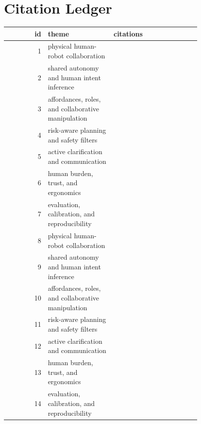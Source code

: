 \documentclass{article}
\begin{document}
\section{Citation Ledger}
\begingroup
\scriptsize
\setlength{\tabcolsep}{4pt}
\begin{longtable}{r p{0.34\linewidth} p{0.45\linewidth}}
\toprule
id & theme & citations\\
\midrule
1 & physical human-robot collaboration & \citep{ogenyi2019physical1,zhang2022cooperative2,dehio2022enabling3} \\
2 & shared autonomy and human intent inference & \citep{lai2022user4,li2022humanaware5,liu2025dtrt6} \\
3 & affordances, roles, and collaborative manipulation & \citep{liu2025multimodal7,chang2018effects8,mol2025fitts9} \\
4 & risk-aware planning and safety filters & \citep{li2022humanaware10,gao2021show11,semeraro2022humanrobot12} \\
5 & active clarification and communication & \citep{romay2017collaborative13,imre2019affordancebased14,wang2023a15} \\
6 & human burden, trust, and ergonomics & \citep{messeri2022a16,losey2018a17,schaefer2016relinquishing18} \\
7 & evaluation, calibration, and reproducibility & \citep{ciccarelli2022a19,deng2017hierarchical20,rega2021collaborative21} \\
8 & physical human-robot collaboration & \citep{raffik2023industry22,sun2023adaptive23,lemasurier2021methods24} \\
9 & shared autonomy and human intent inference & \citep{liu2022workerintheloop25,lagomarsino2022robot26,jung2024touch27} \\
10 & affordances, roles, and collaborative manipulation & \citep{loy2025exploring28,quenehen2022economic29,malik2019complexitybased30} \\
11 & risk-aware planning and safety filters & \citep{chan2020an31,rezayati2022improving32,liu2022human33} \\
12 & active clarification and communication & \citep{rahman2017cyberphysicalsocial34,umbrico2022design35,pantano2022influence36} \\
13 & human burden, trust, and ergonomics & \citep{zhou2022coupled37,bonello2024the38,wang2018controlling39} \\
14 & evaluation, calibration, and reproducibility & \citep{aldini2019effect40,angleraud2021coordinating41,kermenov2025near42} \\

\end{longtable}
\end{document}

